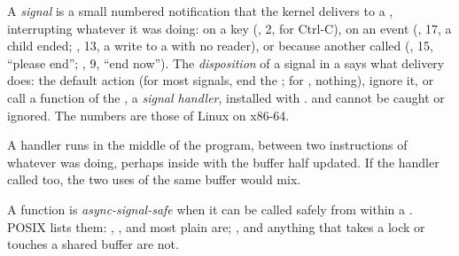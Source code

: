 \begin{definition}\label{def:b2:files-pipes-signals:signal}
A \emph{signal} is a small numbered notification that the kernel delivers to a , interrupting
whatever it was doing: on a key (, 2, for Ctrl-C), on an event (, 17, a child ended;
, 13, a write to a  with no reader), or because another  called 
(, 15, ``please end''; , 9, ``end now''). The \emph{disposition} of a signal in a  says what delivery does: the default action (for most signals, end the
; for , nothing), ignore it, or call a function of the , a \emph{signal
handler}, installed with .  and  cannot be caught
or ignored. The numbers are those of Linux on x86-64.
\end{definition}




A handler runs in the middle of the program, between two instructions of whatever  was doing, perhaps
inside  with the buffer half updated. If the handler called  too, the two uses of the same
buffer would mix.

\begin{definition}\label{def:b2:files-pipes-signals:async-safe}
A function is \emph{async-signal-safe} when it can be called safely from within a
. POSIX lists them: , ,  and most plain  are;
,  and anything that takes a lock or touches a shared buffer are not.
\end{definition}

